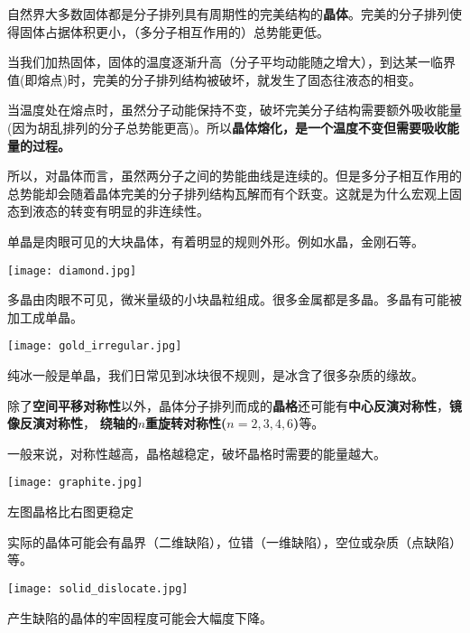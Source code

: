 \documentclass[CJK]{beamer}
\begin{document}
\begin{frame}
\bch
\bitem
\item{自然界大多数固体都是分子排列具有周期性的完美结构的{\bf 晶体}。完美的分子排列使得固体占据体积更小，（多分子相互作用的）总势能更低。}
\item{当我们加热固体，固体的温度逐渐升高（分子平均动能随之增大），到达某一临界值(即熔点)时，完美的分子排列结构被破坏，就发生了固态往液态的相变。}
\item{当温度处在熔点时，虽然分子动能保持不变，破坏完美分子结构需要额外吸收能量(因为胡乱排列的分子总势能更高)。所以{\bf 晶体熔化，是一个温度不变但需要吸收能量的过程。}}
\eitem
\ech
\end{frame}

\begin{frame}
\bch
所以，对晶体而言，虽然两分子之间的势能曲线是连续的。但是多分子相互作用的总势能却会随着晶体完美的分子排列结构瓦解而有个跃变。这就是为什么宏观上固态到液态的转变有明显的非连续性。
\ech
\end{frame}

\begin{frame}
\bch
\bitem
\item{单晶是肉眼可见的大块晶体，有着明显的规则外形。例如水晶，金刚石等。

\texttt{[image: diamond.jpg]}
}

\item{多晶由肉眼不可见，微米量级的小块晶粒组成。很多金属都是多晶。多晶有可能被加工成单晶。

\texttt{[image: gold\_irregular.jpg]}
}
\item{纯冰一般是单晶，我们日常见到冰块很不规则，是冰含了很多杂质的缘故。}
\eitem
\ech
\end{frame}


\begin{frame}
\bch
除了{\bf 空间平移对称性}以外，晶体分子排列而成的{\bf 晶格}还可能有{\bf 中心反演对称性}，{\bf 镜像反演对称性}， {\bf 绕轴的$n$重旋转对称性($n=2,3,4,6$)}等。

一般来说，对称性越高，晶格越稳定，破坏晶格时需要的能量越大。

\bcenter
\texttt{[image: graphite.jpg]}
\ecenter

左图晶格比右图更稳定
\ech
\end{frame}


\begin{frame}
\bch
实际的晶体可能会有晶界（二维缺陷），位错（一维缺陷），空位或杂质（点缺陷）等。

\bcenter
\texttt{[image: solid\_dislocate.jpg]}
\ecenter

产生缺陷的晶体的牢固程度可能会大幅度下降。
\ech
\end{frame}
\end{document}
